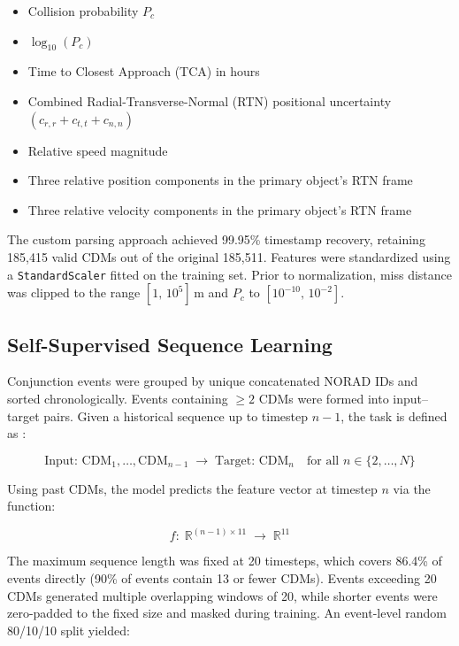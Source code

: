 \documentclass[12pt, a4paper]{article}
\begin{document}
\begin{itemize}
    \item Collision probability $P_c$
    \item $\log_{10}(P_c)$
    \item Time to Closest Approach (TCA) in hours
    \item Combined Radial-Transverse-Normal (RTN) positional uncertainty $(c_{r,r} + c_{t,t} + c_{n,n})$
    \item Relative speed magnitude
    \item Three relative position components in the primary object's RTN frame
    \item Three relative velocity components in the primary object's RTN frame
\end{itemize}

The custom parsing approach achieved 99.95\% timestamp recovery, retaining 185,415 valid CDMs out of the original 185,511. Features were standardized using a \texttt{StandardScaler} fitted on the training set. Prior to normalization, miss distance was clipped to the range $[1,\, 10^5]$\,m and $P_c$ to $[10^{-10},\, 10^{-2}]$.

\subsection{Self-Supervised Sequence Learning}

Conjunction events were grouped by unique concatenated NORAD IDs and sorted chronologically. Events containing $\geq 2$ CDMs were formed into input--target pairs. Given a historical sequence up to timestep $n-1$, the task is defined as \cite{ref3}:

\begin{equation}
    \text{Input: } \text{CDM}_1, \ldots, \text{CDM}_{n-1} \;\rightarrow\; \text{Target: } \text{CDM}_n
    \quad \text{for all } n \in \{2, \ldots, N\}
\end{equation}

Using past CDMs, the model predicts the feature vector at timestep $n$ via the function:

\begin{equation}
    f:\; \mathbb{R}^{(n-1)\times 11} \;\rightarrow\; \mathbb{R}^{11}
\end{equation}

The maximum sequence length was fixed at 20 timesteps, which covers 86.4\% of events directly (90\% of events contain 13 or fewer CDMs). Events exceeding 20 CDMs generated multiple overlapping windows of 20, while shorter events were zero-padded to the fixed size and masked during training. An event-level random 80/10/10 split yielded:
\end{document}
